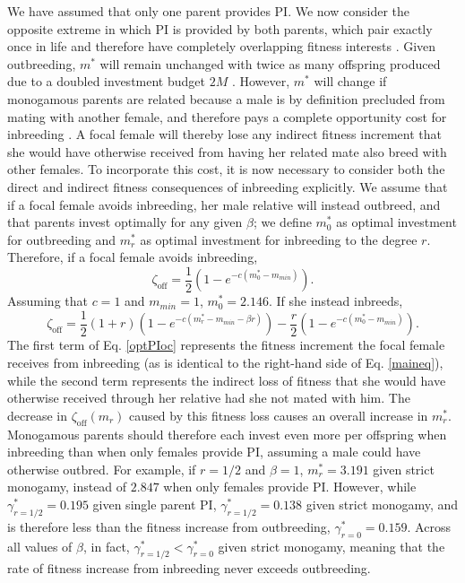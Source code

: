 \documentclass[12pt]{article}
\begin{document}
We have assumed that only one parent provides PI. We now consider the opposite extreme in which PI is provided by both parents, which pair exactly once in life and therefore have completely overlapping fitness interests \cite[i.e., strict monogamy; see][]{Parker1985}. Given outbreeding, $m^{*}$ will remain unchanged with twice as many offspring produced due to a doubled investment budget $2M$ \cite[][]{Parker1985}. However, $m^{*}$ will change if monogamous parents are related because a male is by definition precluded from mating with another female, and therefore pays a complete opportunity cost for inbreeding \cite[][]{Waser1986}. A focal female will thereby lose any indirect fitness increment that she would have otherwise received from having her related mate also breed with other females. To incorporate this cost, it is now necessary to consider both the direct and indirect fitness consequences of inbreeding explicitly. We assume that if a focal female avoids inbreeding, her male relative will instead outbreed, and that parents invest optimally for any given $\beta$; we define $m^{*}_{0}$ as optimal investment for outbreeding and $m^{*}_{r}$ as optimal investment for inbreeding to the degree $r$. Therefore, if a focal female avoids inbreeding,
\begin{equation} \label{optPI}
\zeta_{\textrm{off}} = \frac{1}{2}\left(1-e^{-c\left(m^{*}_{0}-m_{min}\right)}\right).
\end{equation}
Assuming that $c=1$ and $m_{min}=1$, $m^{*}_{0}=2.146$. If she instead inbreeds,
\begin{equation} \label{optPIoc}
\zeta_{\textrm{off}} = \frac{1}{2}\left(1+r\right)\left(1-e^{-c\left(m^{*}_{r}-m_{min}-\beta r\right)}\right) - \frac{r}{2}\left(1-e^{-c\left(m^{*}_{0}-m_{min}\right)}\right).
\end{equation}
The first term of Eq. \ref{optPIoc} represents the fitness increment the focal female receives from inbreeding (as is identical to the right-hand side of Eq. \ref{maineq}), while the second term represents the indirect loss of fitness that she would have otherwise received through her relative had she not mated with him. The decrease in $\zeta_{\textrm{off}}(m_{r})$ caused by this fitness loss causes an overall increase in $m^{*}_{r}$. Monogamous parents should therefore each invest even more per offspring when inbreeding than when only females provide PI, assuming a male could have otherwise outbred. For example, if $r=1/2$ and $\beta=1$, $m^{*}_{r}= 3.191$ given strict monogamy, instead of $2.847$ when only females provide PI.  However, while $\gamma^{*}_{r=1/2}=0.195$ given single parent PI, $\gamma^{*}_{r=1/2}=0.138$ given strict monogamy, and is therefore less than the fitness increase from outbreeding, $\gamma^{*}_{r=0}=0.159$. Across all values of $\beta$, in fact, $\gamma^{*}_{r=1/2} < \gamma^{*}_{r=0}$ given strict monogamy, meaning that the rate of fitness increase from inbreeding never exceeds outbreeding.
\end{document}
